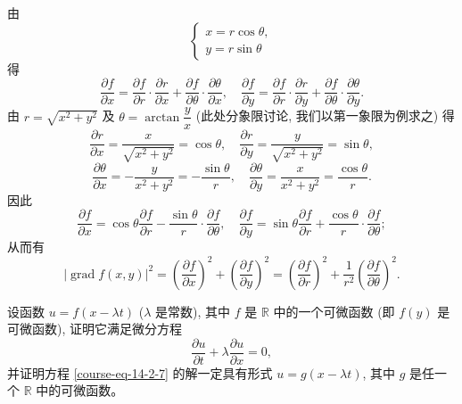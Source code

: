 \documentclass[12pt,fontset=fandol]{ctexart}
\begin{document}
\begin{solve}\quad 由
\[
  \begin{cases}
    x=r\cos\theta,\\
    y=r\sin\theta
  \end{cases}
\]
得
\[
  \frac{\partial f}{\partial x}
  =\frac{\partial f}{\partial r}\cdot\frac{\partial r}{\partial x}
  +\frac{\partial f}{\partial\theta}\cdot\frac{\partial\theta}{\partial x},
  \quad
  \frac{\partial f}{\partial y}
  =\frac{\partial f}{\partial r}\cdot\frac{\partial r}{\partial y}
  +\frac{\partial f}{\partial\theta}\cdot\frac{\partial\theta}{\partial y}.
\]
由 $r=\sqrt{x^2+y^2}$ 及 $\theta=\arctan\dfrac yx$ (此处分象限讨论, 我们以第一象限为例求之) 得
\[
  \frac{\partial r}{\partial x}=\frac{x}{\sqrt{x^2+y^2}}=\cos\theta,\quad
  \frac{\partial r}{\partial y}=\frac{y}{\sqrt{x^2+y^2}}=\sin\theta,
\]
\[
  \frac{\partial\theta}{\partial x}=-\frac{y}{x^2+y^2}=-\frac{\sin\theta}{r},\quad
  \frac{\partial\theta}{\partial y}=\frac{x}{x^2+y^2}=\frac{\cos\theta}{r}.
\]
因此
\[
  \frac{\partial f}{\partial x}
  =\cos\theta\frac{\partial f}{\partial r}
  -\frac{\sin\theta}{r}\cdot\frac{\partial f}{\partial\theta},
  \quad
  \frac{\partial f}{\partial y}
  =\sin\theta\frac{\partial f}{\partial r}
  +\frac{\cos\theta}{r}\cdot\frac{\partial f}{\partial\theta};
\]
从而有
\[
  |\operatorname{grad}f(x,y)|^2
  =
  \left(\frac{\partial f}{\partial x}\right)^2+
  \left(\frac{\partial f}{\partial y}\right)^2
  =
  \left(\frac{\partial f}{\partial r}\right)^2+
  \frac1{r^2}\left(\frac{\partial f}{\partial\theta}\right)^2.
\]

\end{solve}
\begin{example}\label{course-example-14-2-6}\quad 设函数 $u=f(x-\lambda t)$ ($\lambda$ 是常数), 其中 $f$ 是 $\mathbb R$ 中的一个可微函数 (即 $f(y)$ 是可微函数), 证明它满足微分方程
\begin{equation}
  \frac{\partial u}{\partial t}+\lambda\frac{\partial u}{\partial x}=0,
\label{course-eq-14-2-7}
\end{equation}
并证明方程 \eqref{course-eq-14-2-7}  的解一定具有形式 $u=g(x-\lambda t)$, 其中 $g$ 是任一个 $\mathbb R$ 中的可微函数。

\end{example}
\end{document}
